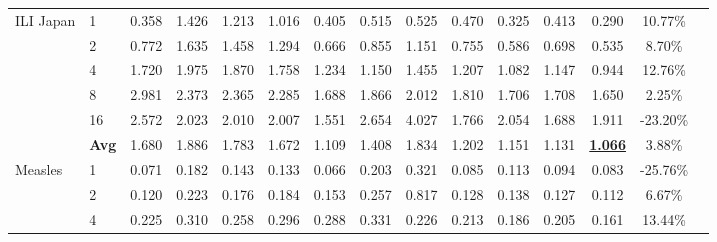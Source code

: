 \begin{table*}[t]
{\begin{tabular}{llccccccccccccc}
        \midrule        
        \multirow{6}{*}{ILI Japan} 
            & 1  
              & \cellcolor{low3}0.358 & 1.426 & 1.213 & 1.016 
              & 0.405 & 0.515 & 0.525 & 0.470 
              & \cellcolor{low2}0.325 & 0.413 & \cellcolor{low1}0.290 
              & 10.77\% \\[2pt]
            & 2  
              & 0.772 & 1.635 & 1.458 & 1.294 
              & \cellcolor{low3}0.666 & 0.855 & 1.151 & 0.755 
              & \cellcolor{low2}0.586 & 0.698 & \cellcolor{low1}0.535 
              & 8.70\% \\[2pt]
            & 4  
              & 1.720 & 1.975 & 1.870 & 1.758 
              & 1.234 & \cellcolor{low3}1.150 & 1.455 & 1.207 
              & \cellcolor{low2}1.082 & 1.147 & \cellcolor{low1}0.944 
              & 12.76\% \\[2pt]
            & 8  
              & 2.981 & 2.373 & 2.365 & 2.285 
              & \cellcolor{low2}1.688 & 1.866 & 2.012 & 1.810 
              & \cellcolor{low3}1.706 & 1.708 & \cellcolor{low1}1.650 
              & 2.25\% \\[2pt]
            & 16 
              & 2.572 & 2.023 & 2.010 & 2.007 
              & \cellcolor{low1}1.551 & 2.654 & 4.027 & \cellcolor{low3}1.766 
              & 2.054 & \cellcolor{low2}1.688 & 1.911 
              & -23.20\% \\[2pt]
            & \textbf{Avg} 
              & 1.680 & 1.886 & 1.783 & 1.672 
              & \cellcolor{low2}1.109 & 1.408 & 1.834 & 1.202 
              & 1.151 & \cellcolor{low3}1.131 & \cellcolor{low1}\textbf{\underline{1.066}}
              & 3.88\% \\
        \midrule
        \multirow{6}{*}{Measles} 
              & 1  
                & \cellcolor{low2}0.071 & 0.182 & 0.143 & 0.133 
                & \cellcolor{low1}0.066 & 0.203 & 0.321 & 0.085 
                & 0.113 & 0.094 & \cellcolor{low3}0.083 
                & -25.76\% \\[2pt]
              & 2  
                & \cellcolor{low2}0.120 & 0.223 & 0.176 & 0.184 
                & 0.153 & 0.257 & 0.817 & 0.128 
                & 0.138 & \cellcolor{low3}0.127 & \cellcolor{low1}0.112 
                & 6.67\% \\[2pt]
              & 4  
                & 0.225 & 0.310 & 0.258 & 0.296 
                & 0.288 & 0.331 & 0.226 & 0.213 
                & \cellcolor{low2}0.186 & \cellcolor{low3}0.205 & \cellcolor{low1}0.161
                & 13.44\% \\[2pt]

\end{tabular}}
\end{table*}

